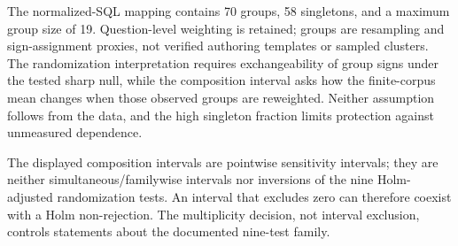 \documentclass[information,article,submit,moreauthors]{Definitions/mdpi}
\begin{document}
\begin{table}[htbp]
\caption{Complete primary factorial family for strict execution equality. Estimates are question-weighted finite-set differences; intervals are 95\% normalized-SQL-group composition-sensitivity intervals. Each sign-randomization used 70 groups, 100,000 draws, and the displayed raw values were Holm-adjusted jointly over all nine rows.}
\label{tab:factorial-nine}\centering\scriptsize
{}
\end{table}

The normalized-SQL mapping contains 70 groups, 58 singletons, and a maximum group size of 19. Question-level weighting is retained; groups are resampling and sign-assignment proxies, not verified authoring templates or sampled clusters. The randomization interpretation requires exchangeability of group signs under the tested sharp null, while the composition interval asks how the finite-corpus mean changes when those observed groups are reweighted. Neither assumption follows from the data, and the high singleton fraction limits protection against unmeasured dependence.

The displayed composition intervals are pointwise sensitivity intervals; they are neither simultaneous/familywise intervals nor inversions of the nine Holm-adjusted randomization tests. An interval that excludes zero can therefore coexist with a Holm non-rejection. The multiplicity decision, not interval exclusion, controls statements about the documented nine-test family.
\end{document}
